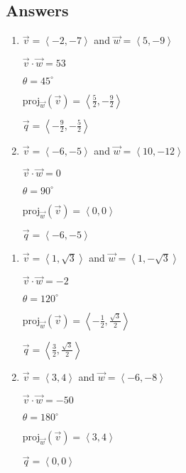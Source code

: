 \documentclass{ximera}
\begin{document}
\newpage

\subsection{Answers}

\begin{multicols}{2} \raggedcolumns 

\begin{enumerate}

\item $\vec{v} = \left\langle -2, -7 \right\rangle$ and $\vec{w} = \left\langle 5, -9 \right\rangle$

 $\vec{v} \cdot \vec{w} = 53$

 $\theta =  45^{\circ}$ 

 $\text{proj}_{\vec{w}}(\vec{v}) = \left\langle \frac{5}{2}, -\frac{9}{2} \right\rangle$

 $\vec{q} = \left\langle -\frac{9}{2}, -\frac{5}{2} \right\rangle$
 
 \vfill
 
\item $\vec{v} = \left\langle -6, -5 \right\rangle$ and $\vec{w} = \left\langle 10, -12 \right\rangle$

 $\vec{v} \cdot \vec{w} = 0$

 $\theta =  90^{\circ}$ 

 $\text{proj}_{\vec{w}}(\vec{v}) = \left\langle 0, 0 \right\rangle$

 $\vec{q} = \left\langle -6, -5 \right\rangle$ 

 
\setcounter{HW}{\value{enumi}}
\end{enumerate}
\end{multicols}


\begin{multicols}{2} \raggedcolumns 
\begin{enumerate}
\setcounter{enumi}{\value{HW}}
\item $\vec{v} = \left\langle 1, \sqrt{3} \right\rangle$ and $\vec{w} = \left\langle 1, -\sqrt{3} \right\rangle$

 $\vec{v} \cdot \vec{w} = -2$

 $\theta =  120^{\circ}$ 

 $\text{proj}_{\vec{w}}(\vec{v}) = \left\langle -\frac{1}{2}, \frac{\sqrt{3}}{2} \right\rangle$

 $\vec{q} = \left\langle \frac{3}{2}, \frac{\sqrt{3}}{2} \right\rangle$
 
 \vfill
 
\item $\vec{v} = \left\langle 3,4 \right\rangle$ and $\vec{w} = \left\langle -6, -8 \right\rangle$

 $\vec{v} \cdot \vec{w} = -50$

 $\theta =  180^{\circ}$ 

 $\text{proj}_{\vec{w}}(\vec{v}) = \left\langle 3, 4 \right\rangle$

 $\vec{q} = \left\langle0, 0\right\rangle$ 

 
\setcounter{HW}{\value{enumi}}
\end{enumerate}
\end{multicols}
 
\end{document}
